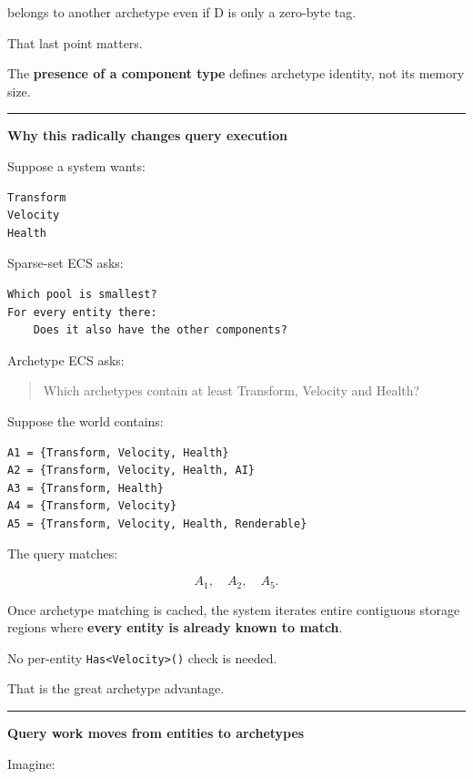 belongs to another archetype even if D is only a zero-byte tag.

That last point matters.

The \textbf{presence of a component type} defines archetype identity, not its memory size.

\begin{center}\rule{0.5\linewidth}{0.5pt}\end{center}

\textbf{Why this radically changes query execution}

Suppose a system wants:

\begin{verbatim}
Transform
Velocity
Health
\end{verbatim}

Sparse-set ECS asks:

\begin{verbatim}
Which pool is smallest?
For every entity there:
    Does it also have the other components?
\end{verbatim}

Archetype ECS asks:

\begin{quote}
Which archetypes contain at least Transform, Velocity and Health?
\end{quote}

Suppose the world contains:

\begin{verbatim}
A1 = {Transform, Velocity, Health}
A2 = {Transform, Velocity, Health, AI}
A3 = {Transform, Health}
A4 = {Transform, Velocity}
A5 = {Transform, Velocity, Health, Renderable}
\end{verbatim}

The query matches:

\[
A_1,\quad A_2,\quad A_5.
\]

Once archetype matching is cached, the system iterates entire contiguous storage regions where \textbf{every entity is already known to match}.

No per-entity \texttt{Has\textless{}Velocity\textgreater{}()} check is needed.

That is the great archetype advantage.

\begin{center}\rule{0.5\linewidth}{0.5pt}\end{center}

\textbf{Query work moves from entities to archetypes}

Imagine:

